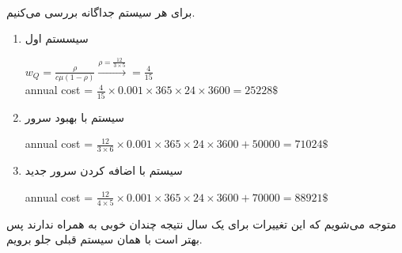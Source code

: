 \\
برای هر سیستم جداگانه بررسی می‌کنیم. \\

\begin{enumerate}
  \item سیسستم اول
  \begin{latin}
    $w_Q=\frac{\rho}{c\mu(1-\rho)} \xrightarrow[]{\rho = \frac{12}{3\times5}}=\frac{4}{15}$ 
    \\
    annual cost = $\frac{4}{15}\times 0.001 \times 365 \times 24 \times 3600 = 25228\$$
  \end{latin}
  \item سیستم با بهبود سرور 
  \begin{latin}
    annual cost = $\frac{12}{3\times6}\times 0.001 \times 365 \times 24 \times 3600 + 50000= 71024\$$
  \end{latin}
  \item سیستم با اضافه کردن سرور جدید
  \begin{latin}
    annual cost = $\frac{12}{4\times5}\times 0.001 \times 365 \times 24 \times 3600 + 70000=88921\$$
  \end{latin}
\end{enumerate}
متوجه می‌شویم که این تغییرات برای یک سال نتیجه چندان خوبی به همراه ندارند پس بهتر است با همان سیستم قبلی جلو برویم.
\\